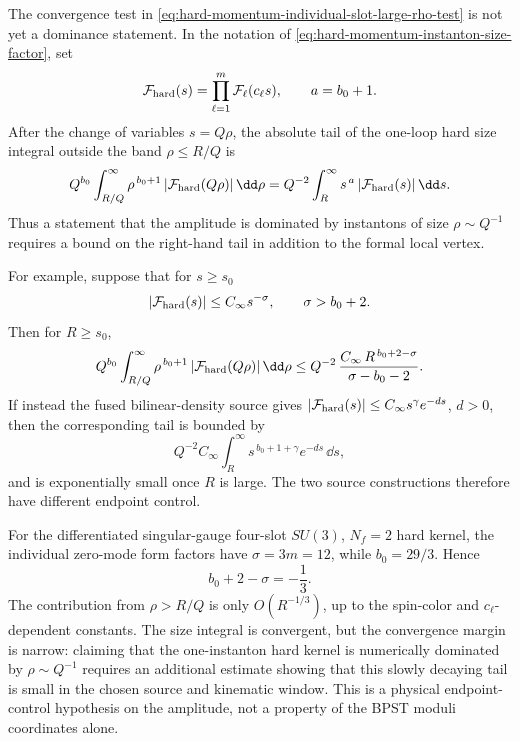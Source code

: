 \begin{controlledapproximation}
\label{ca:hard-size-dominance-vs-convergence}
The convergence test in
\eqref{eq:hard-momentum-individual-slot-large-rho-test} is not yet a
dominance statement.  In the notation of
\eqref{eq:hard-momentum-instanton-size-factor}, set
\[
  \mathcal F_{\rm hard}(s)
  =
  \prod_{\ell=1}^{m}\mathcal F_\ell(c_\ell s),
  \qquad
  a=b_0+1 .
\]
After the change of variables \(s=Q\rho\), the absolute tail of the one-loop
hard size integral outside the band \(\rho\le R/Q\) is
\begin{equation}
  Q^{b_0}
  \int_{R/Q}^{\infty}
  \rho^{\,b_0+1}\,
  |\mathcal F_{\rm hard}(Q\rho)|\,\dd\rho
  =
  Q^{-2}
  \int_{R}^{\infty}
  s^{\,a}\,|\mathcal F_{\rm hard}(s)|\,\dd s .
  \label{eq:hard-size-tail-change-variable}
\end{equation}
Thus a statement that the amplitude is dominated by instantons of size
\(\rho\sim Q^{-1}\) requires a bound on the right-hand tail in addition to
the formal local vertex.

For example, suppose that for \(s\ge s_0\)
\[
  |\mathcal F_{\rm hard}(s)|\le C_\infty s^{-\sigma},
  \qquad \sigma>b_0+2 .
\]
Then for \(R\ge s_0\),
\begin{equation}
  Q^{b_0}
  \int_{R/Q}^{\infty}
  \rho^{\,b_0+1}\,
  |\mathcal F_{\rm hard}(Q\rho)|\,\dd\rho
  \le
  Q^{-2}\,
  \frac{C_\infty\,R^{\,b_0+2-\sigma}}
       {\sigma-b_0-2}.
  \label{eq:hard-size-power-tail-bound}
\end{equation}
If instead the fused bilinear-density source gives
\(|\mathcal F_{\rm hard}(s)|\le C_\infty s^\gamma e^{-ds}\), \(d>0\), then
the corresponding tail is bounded by
\[
  Q^{-2}C_\infty
  \int_R^\infty s^{\,b_0+1+\gamma}e^{-ds}\,\dd s ,
\]
and is exponentially small once \(R\) is large.  The two source
constructions therefore have different endpoint control.

For the differentiated singular-gauge four-slot \(SU(3)\), \(N_f=2\) hard
kernel, the individual zero-mode form factors have
\(\sigma=3m=12\), while \(b_0=29/3\).  Hence
\[
  b_0+2-\sigma=-\frac13 .
\]
The contribution from \(\rho>R/Q\) is only \(O(R^{-1/3})\), up to the
spin-color and \(c_\ell\)-dependent constants.  The size integral is
convergent, but the convergence margin is narrow: claiming that the
one-instanton hard kernel is numerically dominated by \(\rho\sim Q^{-1}\)
requires an additional estimate showing that this slowly decaying tail is
small in the chosen source and kinematic window.  This is a physical
endpoint-control hypothesis on the amplitude, not a property of the BPST
moduli coordinates alone.


\end{controlledapproximation}
